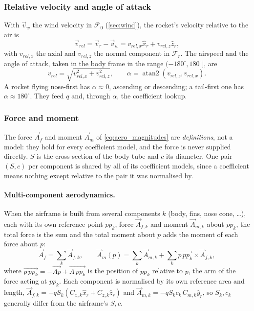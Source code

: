 \subsubsection{Relative velocity and angle of attack}\label{sec:relwind}
With $\vec{v}_w$ the wind velocity in $\mathcal{F}_0$ (\autoref{sec:wind}), the rocket's velocity
relative to the air is
\begin{equation}
    \vec{v}_{rel} = \vec{v}_r - \vec{v}_w = v_{rel,x}\hat{x}_r + v_{rel,z}\hat{z}_r,
\end{equation}
with $v_{rel,x}$ the axial and $v_{rel,z}$ the normal component in $\mathcal{F}_r$. The airspeed and
the angle of attack, taken in the body frame in the range $(-180^\circ,180^\circ]$, are
\begin{equation}
    v_{rel} = \sqrt{v_{rel,x}^2+v_{rel,z}^2}, \qquad \alpha = \operatorname{atan2}(v_{rel,z}, v_{rel,x}).
\end{equation}
A rocket flying nose-first has $\alpha\approx0$, ascending or descending; a tail-first one has
$\alpha\approx180^\circ$. They feed $q$ and, through $\alpha$, the coefficient lookup.

\subsubsection{Force and moment}
The force $\vec{A}_f$ and moment $\vec{A}_m$ of \autoref{eq:aero_magnitudes} are \emph{definitions},
not a model: they hold for every coefficient model, and the force is never supplied directly. $S$
is the cross-section of the body tube and $c$ its diameter.
One pair $(S,c)$ per component is shared by all of its coefficient models, since a coefficient
means nothing except relative to the pair it was normalised by.

\paragraph{Multi-component aerodynamics.} When the airframe is built from several components $k$
(body, fins, nose cone, \dots), each with its own reference point $pp_k$, force $\vec{A}_{f,k}$ and
moment $\vec{A}_{m,k}$ about $pp_k$, the total force is the sum and the total moment about $p$
adds the moment of each force about $p$:
\begin{equation} \label{eq:aero_multi}
    \vec{A}_f = \sum_k \vec{A}_{f,k}, \qquad
    \vec{A}_m(p) = \sum_k \vec{A}_{m,k} + \sum_k \vec{p\,pp_k}\times\vec{A}_{f,k},
\end{equation}
where $\vec{p\,pp_k}=-\vec{Ap}+\vec{A\,pp_k}$ is the position of $pp_k$ relative to $p$, the arm of
the force acting at $pp_k$. Each component is normalised by its
own reference area and length, $\vec{A}_{f,k}=-qS_k(C_{x,k}\hat{x}_r+C_{z,k}\hat{z}_r)$ and
$\vec{A}_{m,k}=-qS_kc_k\,C_{m,k}\hat{y}_r$, so $S_k,c_k$ generally differ from the airframe's $S,c$.


